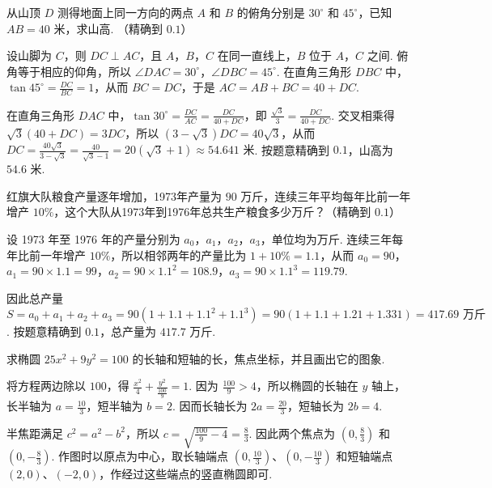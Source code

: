 \begin{problem}
从山顶 \(D\) 测得地面上同一方向的两点 \(A\) 和 \(B\) 的俯角分别是 \(30^\circ\) 和 \(45^\circ\)，已知 \(AB=40\text{ 米}\)，求山高. （精确到 \(0.1\)）
\end{problem}

\begin{solution}

设山脚为 \(C\)，则 \(DC\perp AC\)，且 \(A\)，\(B\)，\(C\) 在同一直线上，\(B\) 位于 \(A\)，\(C\) 之间. 俯角等于相应的仰角，所以 \(\angle DAC=30^\circ\)，\(\angle DBC=45^\circ\). 在直角三角形 \(DBC\) 中，\(\tan45^\circ=\frac{DC}{BC}=1\)，从而 \(BC=DC\)，于是 \(AC=AB+BC=40+DC\).

在直角三角形 \(DAC\) 中，\(\tan30^\circ=\frac{DC}{AC}=\frac{DC}{40+DC}\)，即 \(\frac{\sqrt3}{3}=\frac{DC}{40+DC}\). 交叉相乘得 \(\sqrt3(40+DC)=3DC\)，所以 \((3-\sqrt3)DC=40\sqrt3\)，从而 \(DC=\frac{40\sqrt3}{3-\sqrt3}=\frac{40}{\sqrt3-1}=20(\sqrt3+1)\approx54.641\text{ 米}\). 按题意精确到 \(0.1\)，山高为 \(54.6\text{ 米}\).
\end{solution}

\begin{problem}
红旗大队粮食产量逐年增加，1973年产量为 \(90\text{ 万斤}\)，连续三年平均每年比前一年增产 \(10\%\)，这个大队从1973年到1976年总共生产粮食多少万斤？（精确到 \(0.1\)）
\end{problem}

\begin{solution}
设 1973 年至 1976 年的产量分别为 \(a_0\)，\(a_1\)，\(a_2\)，\(a_3\)，单位均为万斤. 连续三年每年比前一年增产 \(10\%\)，所以相邻两年的产量比为 \(1+10\%=1.1\)，从而 \(a_0=90\)，\(a_1=90\times1.1=99\)，\(a_2=90\times1.1^2=108.9\)，\(a_3=90\times1.1^3=119.79\).

因此总产量 \(S=a_0+a_1+a_2+a_3=90(1+1.1+1.1^2+1.1^3)=90(1+1.1+1.21+1.331)=417.69\text{ 万斤}\). 按题意精确到 \(0.1\)，总产量为 \(417.7\text{ 万斤}\).
\end{solution}

\begin{problem}
求椭圆 \(25x^2+9y^2=100\) 的长轴和短轴的长，焦点坐标，并且画出它的图象.
\end{problem}

\begin{solution}
将方程两边除以 \(100\)，得 \(\frac{x^2}{4}+\frac{y^2}{\frac{100}{9}}=1\). 因为 \(\frac{100}{9}>4\)，所以椭圆的长轴在 \(y\) 轴上，长半轴为 \(a=\frac{10}{3}\)，短半轴为 \(b=2\). 因而长轴长为 \(2a=\frac{20}{3}\)，短轴长为 \(2b=4\).

半焦距满足 \(c^2=a^2-b^2\)，所以 \(c=\sqrt{\frac{100}{9}-4}=\frac83\). 因此两个焦点为 \(\left(0,\frac83\right)\) 和 \(\left(0,-\frac83\right)\). 作图时以原点为中心，取长轴端点 \(\left(0,\frac{10}{3}\right)\)、\(\left(0,-\frac{10}{3}\right)\) 和短轴端点 \((2,0)\)、\((-2,0)\)，作经过这些端点的竖直椭圆即可.

\end{solution}
